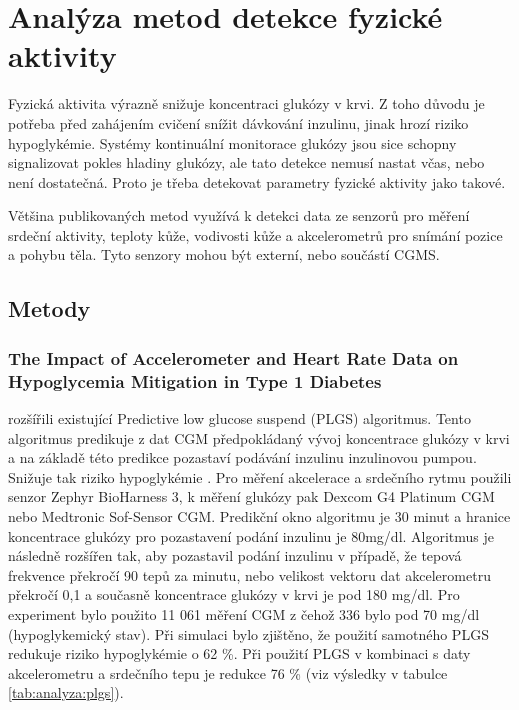 \chapter{Analýza metod detekce fyzické aktivity}

Fyzická aktivita výrazně snižuje koncentraci glukózy v krvi. Z toho důvodu je potřeba před zahájením cvičení snížit dávkování inzulinu, jinak hrozí riziko hypoglykémie. Systémy kontinuální monitorace glukózy jsou sice schopny signalizovat pokles hladiny glukózy, ale tato detekce nemusí nastat včas, nebo není dostatečná. Proto je třeba detekovat parametry fyzické aktivity jako takové.

Většina publikovaných metod využívá k detekci data ze senzorů pro měření srdeční aktivity, teploty kůže, vodivosti kůže a akcelerometrů pro snímání pozice a pohybu těla. Tyto senzory mohou být externí, nebo součástí CGMS.

\section{Metody}
\subsection{The Impact of Accelerometer and Heart Rate Data on Hypoglycemia Mitigation in Type 1 Diabetes}
\label{ch:analyza:PLGS}

\citet{analyzaPA.PLGS} rozšířili existující Predictive low glucose suspend (PLGS) algoritmus. Tento algoritmus predikuje z dat CGM předpokládaný vývoj koncentrace glukózy v krvi a na základě této predikce pozastaví podávání inzulinu inzulinovou pumpou. Snižuje tak riziko hypoglykémie \citep{analyzaPA.PLGS2}.
Pro měření akcelerace a srdečního rytmu použili senzor Zephyr BioHarness 3, k měření glukózy pak Dexcom G4 Platinum CGM nebo Medtronic Sof-Sensor CGM. Predikční okno algoritmu je 30 minut a hranice koncentrace glukózy pro pozastavení podání inzulinu je 80mg/dl. Algoritmus je následně rozšířen tak, aby pozastavil podání inzulinu v případě, že tepová frekvence překročí 90 tepů za minutu, nebo velikost vektoru dat akcelerometru překročí 0,1 a současně koncentrace glukózy v krvi je pod 180 mg/dl.
Pro experiment bylo použito 11 061 měření CGM z čehož 336 bylo pod 70 mg/dl (hypoglykemický stav). Při simulaci bylo zjištěno, že použití samotného PLGS redukuje riziko hypoglykémie o 62 \%. Při použití PLGS v kombinaci s daty akcelerometru a srdečního tepu je redukce 76 \% (viz výsledky v tabulce \ref{tab:analyza:plgs}).

